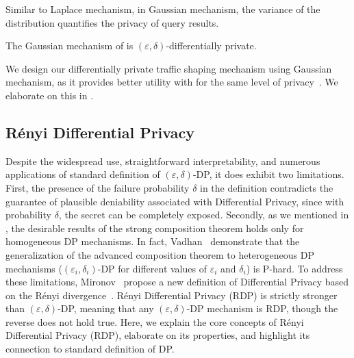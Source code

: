 Similar to Laplace mechanism, in Gaussian mechanism, the variance of the distribution quantifies the privacy of query results.
\begin{proposition}
  The Gaussian mechanism of  is $(\varepsilon, \delta)$-differentially private. 
\end{proposition}
We design our differentially private traffic shaping mechanism using Gaussian mechanism, as it provides better utility with for the same level of privacy~\cite{dwork2014algorithmic}. 
We elaborate on this in .

\subsection{R\'enyi Differential Privacy}\label{subsec:dp-background-rdp}
Despite the widespread use, straightforward interpretability, and numerous applications of standard definition of $(\varepsilon, \delta)$-DP, it does exhibit two limitations. 
First, the presence of the failure probability $\delta$ in the definition contradicts the guarantee of  plausible deniability associated with Differential Privacy, since with probability $\delta$, the secret can be completely exposed.    
Secondly, as we mentioned in , the desirable results of the strong composition theorem holds only for homogeneous DP mechanisms.
In fact, Vadhan~ demonstrate that the generalization of the advanced composition theorem to heterogeneous DP mechanisms (\ie $(\varepsilon_i, \delta_i)$-DP for different values of $\varepsilon_i$ and $\delta_i$) is P-hard.
To address these limitations, Mironov~ propose a new definition of Differential Privacy based on the R\'enyi divergence~\cite{renyi1961measures}.
R\'enyi Differential Privacy (RDP) is strictly stronger than $(\varepsilon, \delta)$-DP, meaning that any $(\varepsilon, \delta)$-DP mechanism is RDP, though the reverse does not hold true.
Here, we explain the core concepts of R\'enyi Differential Privacy (RDP), elaborate on its properties, and highlight its connection to standard definition of DP.

